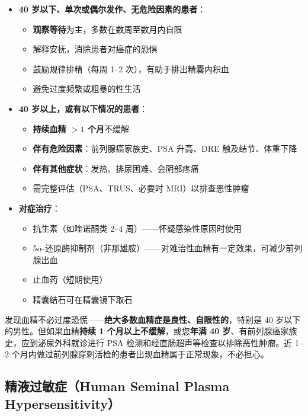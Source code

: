 \documentclass[12pt,a4paper,twoside]{ctexbook}
\begin{document}
\begin{itemize}[leftmargin=2cm]
	\item \textbf{40 岁以下、单次或偶尔发作、无危险因素的患者}：
	\begin{itemize}
		\item \textbf{观察等待}为主，多数在数周至数月内自限
		\item 解释安抚，消除患者对癌症的恐惧
		\item 鼓励规律排精（每周 1--2 次），有助于排出精囊内积血
		\item 避免过度频繁或粗暴的性生活
	\end{itemize}

	\item \textbf{40 岁以上，或有以下情况的患者}：
	\begin{itemize}
		\item \textbf{持续血精 $>1$ 个月}不缓解
		\item \textbf{伴有危险因素}：前列腺癌家族史、PSA 升高、DRE 触及结节、体重下降
		\item \textbf{伴有其他症状}：发热、排尿困难、会阴部疼痛
		\item 需完整评估（PSA、TRUS、必要时 MRI）以排查恶性肿瘤
	\end{itemize}

	\item \textbf{对症治疗}：
	\begin{itemize}
		\item 抗生素（如喹诺酮类 2--4 周）——怀疑感染性原因时使用
		\item 5$\alpha$-还原酶抑制剂（非那雄胺）——对难治性血精有一定效果，可减少前列腺出血
		\item 止血药（短期使用）
		\item 精囊结石可在精囊镜下取石
	\end{itemize}
\end{itemize}

\begin{tcolorbox}[colback=pink!5!white,colframe=red!50!black,title=贴心小叮咛]
发现血精不必过度恐慌——\textbf{绝大多数血精症是良性、自限性的}，特别是 40 岁以下的男性。但如果血精\textbf{持续 1 个月以上不缓解}，或您\textbf{年满 40 岁}、有前列腺癌家族史，应到泌尿外科就诊进行 PSA 检测和经直肠超声等检查以排除恶性肿瘤。近 1--2 个月内做过前列腺穿刺活检的患者出现血精属于正常现象，不必担心。
\end{tcolorbox}

\subsection{精液过敏症（Human Seminal Plasma Hypersensitivity）}
\label{subsec:seminal_allergy}
\end{document}
